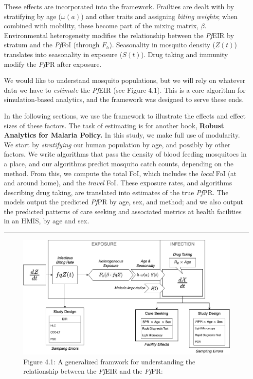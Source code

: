 \documentclass[
]{book}
\begin{document}
These effects are incorporated into the framework. Frailties are dealt with by stratifying by age (\(\omega(a)\)) and other traits and assigning \emph{biting weights}; when combined with mobility, these become part of the mixing matrix, \(\beta\). Environmental heterogeneity modifies the relationship between the \emph{Pf}EIR by stratum and the \emph{Pf}FoI (through \(F_h\)). Seasonality in mosquito density (\(Z(t)\)) translates into seasonality in exposure (\(S(t)\)). Drug taking and immunity modify the \emph{Pf}PR after exposure.

We would like to understand mosquito populations, but we will rely on whatever data we have to \emph{estimate} the \emph{Pf}EIR (see Figure 4.1). This is a core algorithm for simulation-based analytics, and the framework was designed to serve these ends.

In the following sections, we use the framework to illustrate the effects and effect sizes of these factors. The task of estimating is for another book, \textbf{Robust Analytics for Malaria Policy.} In this study, we make full use of modularity. We start by \emph{stratifying} our human population by age, and possibly by other factors. We write algorithms that pass the density of blood feeding mosquitoes in a place, and our algorithms predict mosquito catch counts, depending on the method. From this, we compute the total FoI, which includes the \emph{local} FoI (at and around home), and the \emph{travel} FoI. These exposure rates, and algorithms describing drug taking, are translated into estimates of the true \emph{Pf}PR. The models output the predicted \emph{Pf}PR by age, sex, and method; and we also output the predicted patterns of care seeking and associated metrics at health facilities in an HMIS, by age and sex.

\begin{center}\rule{0.5\linewidth}{0.5pt}\end{center}

\begin{figure}
\centering
\includegraphics{./Figures/Estimation.png}
\caption{Figure 4.1: A generalized framwork for understanding the relationship between the \emph{Pf}EIR and the \emph{Pf}PR:}
\end{figure}
\end{document}
